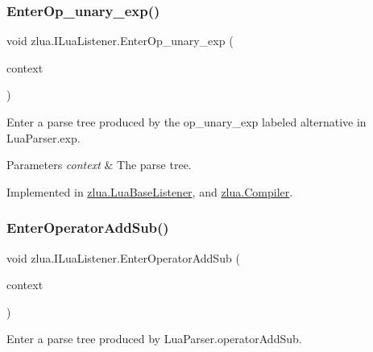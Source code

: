 \subsubsection{\texorpdfstring{Enter\+Op\+\_\+unary\+\_\+exp()}{EnterOp\_unary\_exp()}}
{\footnotesize\ttfamily void zlua.\+I\+Lua\+Listener.\+Enter\+Op\+\_\+unary\+\_\+exp (\begin{DoxyParamCaption}\item[{\mbox{[}\+Not\+Null\mbox{]} \mbox{\hyperlink{classzlua_1_1_lua_parser_1_1_op__unary__exp_context}{Lua\+Parser.\+Op\+\_\+unary\+\_\+exp\+Context}}}]{context }\end{DoxyParamCaption})}



Enter a parse tree produced by the {\ttfamily op\+\_\+unary\+\_\+exp} labeled alternative in Lua\+Parser.\+exp. 


\begin{DoxyParams}{Parameters}
{\em context} & The parse tree.\\
\hline
\end{DoxyParams}


Implemented in \mbox{\hyperlink{classzlua_1_1_lua_base_listener_ad4db24437ff42fb074c69313ec11818d}{zlua.\+Lua\+Base\+Listener}}, and \mbox{\hyperlink{classzlua_1_1_compiler_a6eb871aad9a35e90e75434308d7edac0}{zlua.\+Compiler}}.

\mbox{\label{interfacezlua_1_1_i_lua_listener_a145cf8b9fa700148a09b9d68624640f8}} 
\subsubsection{\texorpdfstring{Enter\+Operator\+Add\+Sub()}{EnterOperatorAddSub()}}
{\footnotesize\ttfamily void zlua.\+I\+Lua\+Listener.\+Enter\+Operator\+Add\+Sub (\begin{DoxyParamCaption}\item[{\mbox{[}\+Not\+Null\mbox{]} \mbox{\hyperlink{classzlua_1_1_lua_parser_1_1_operator_add_sub_context}{Lua\+Parser.\+Operator\+Add\+Sub\+Context}}}]{context }\end{DoxyParamCaption})}



Enter a parse tree produced by Lua\+Parser.\+operator\+Add\+Sub. 


